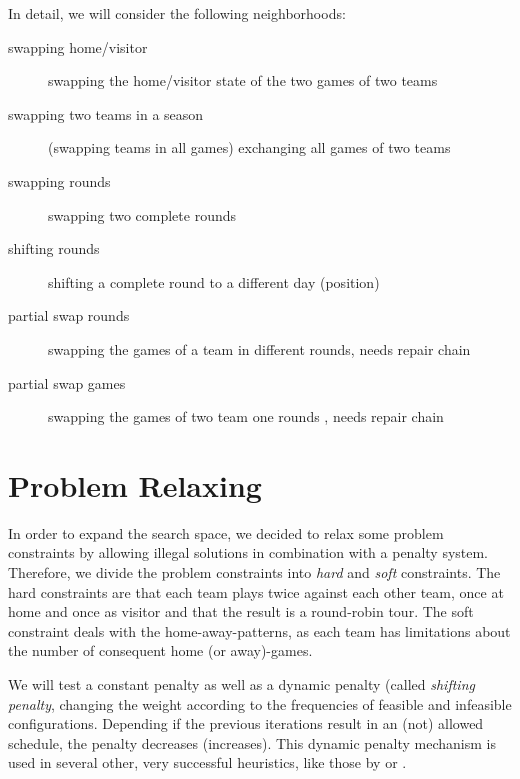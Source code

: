 \documentclass[a4paper,11pt]{article}
\begin{document}
In detail, we will consider the following neighborhoods:
\begin{description}
	\item[swapping home/visitor] swapping the home/visitor state of the two games of two teams
	\item[swapping two teams in a season] (swapping teams in all games) exchanging all games of two teams
	\item[swapping rounds] swapping two complete rounds
	\item[shifting rounds] shifting a complete round to a different day (position)
	\item[partial swap rounds] swapping the games of a team in different rounds, \cite{Gaspero07,HentenryckV06, Chen_anant} needs repair chain
	\item[partial swap games] swapping the games of two team one rounds \cite{Gaspero07, HentenryckV06}, needs repair chain
\end{description}

\section{Problem Relaxing}
In order to expand the search space, we decided to relax some problem constraints by allowing illegal solutions in combination with a penalty system. 
Therefore, we divide the problem constraints into \emph{hard} and \emph{soft} constraints. The hard constraints are that each team plays twice against each other team, once at home and once as visitor and that the result is a round-robin tour. The soft constraint deals with the home-away-patterns, as each team has limitations about the number of consequent home (or away)-games.

We will test a constant penalty as well as a dynamic penalty (called \emph{shifting penalty}, changing the weight according to the frequencies of feasible and infeasible configurations. Depending if the previous iterations result in an (not) allowed schedule, the penalty decreases (increases). This dynamic penalty mechanism is used in several other, very successful heuristics, like those by \cite{Anagnostopoulos06} or \cite{Gaspero07}.



\end{document}
